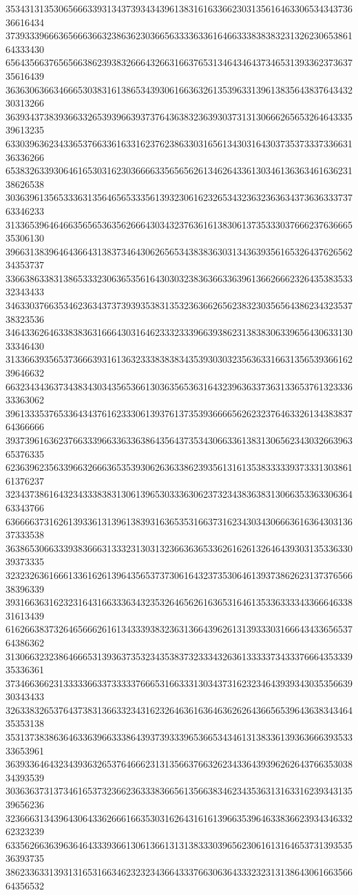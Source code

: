 35343131353065666339313437393434396138316163366230313561646330653434373636616434
37393339666365666366323863623036656333363361646633383838323132623065386164333430
65643566376565663862393832666432663166376531346434643734653139336237363735616439
36363063663466653038316138653439306166363261353963313961383564383764343230313266
36393437383936633265393966393737643638323639303731313066626565326464333539613235
63303963623433653766336163316237623863303165613430316430373537333733663136336266
65383263393064616530316230366663356565626134626433613034613636346163623138626538
30363961356533363135646565333561393230616232653432363236363437363633373763346233
31336539646466356565363562666430343237636161383061373533303766623763666535306130
39663138396464366431383734643062656534383836303134363935616532643762656234353737
33663863383138653332306365356164303032383636633639613662666232643538353332343433
34633037663534623634373739393538313532363662656238323035656438623432353738323536
34643362646338383631666430316462333233396639386231383830633965643063313033346430
31336639356537366639316136323338383834353930303235636331663135653936616239646632
66323434363734383430343565366130363565363164323963633736313365376132333633363062
39613335376533643437616233306139376137353936666562623237646332613438383764366666
39373961636237663339663363363864356437353430663361383130656234303266396365376335
62363962356339663266636535393062636338623935613161353833333937333130386161376237
32343738616432343338383130613965303336306237323438363831306635336330636463343766
63666637316261393361313961383931636535316637316234303430666361636430313637333538
36386530663339383666313332313031323663636533626162613264643930313533633039373335
32323263616661336162613964356537373061643237353064613937386262313737656638396339
39316636316232316431663336343235326465626163653164613533633334336664633831613439
61626638373264656662616134333938323631366439626131393330316664343365653764386362
31306632323864666531393637353234353837323334326361333337343337666435333935336361
37346636623133333663373333376665316633313034373162323464393934303535663930343433
32633832653764373831366332343162326463616364636262643665653964363834346435353138
35313738386364633639663338643937393339653665343461313833613936366639353333653961
36393364643234393632653764666231313566376632623433643939626264376635303834393539
30363637313734616537323662363338366561356638346234353631316331623934313539656236
32366631343964306433626661663530316264316161396635396463383662393434633262323239
63356266363963646433393661306136613131383330396562306161316465373139353536393735
38623363313931316531663462323234366433376630636433323231313864306166356664356532
